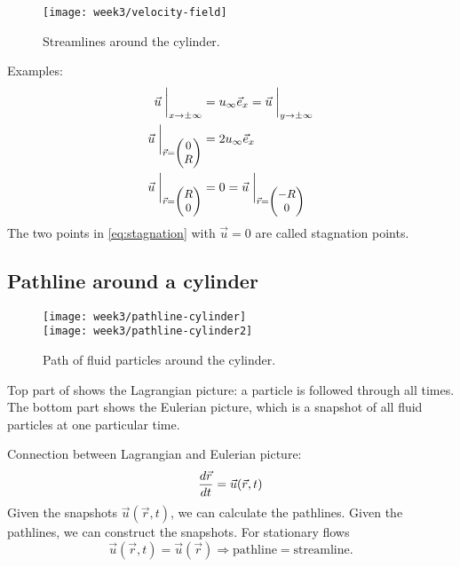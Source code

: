 \begin{figure}[!h]
    \centering
    \texttt{[image: week3/velocity-field]}
    \caption{Streamlines around the cylinder.}
    \label{fig:velocity-field2}
\end{figure}

Examples:
\begin{align}
\vec{u}\biggm\vert_{x\rightarrow\pm\infty} &= u_\infty\vec{e}_x = \vec{u}\biggm\vert_{y\rightarrow\pm\infty}\\
\vec{u}\biggm\vert_{\small\vec{r}=\begin{pmatrix} 0 \\ R
\end{pmatrix}} &= 2u_\infty\vec{e}_x \\
\vec{u}\biggm\vert_{\small\vec{r}=\begin{pmatrix} R \\ 0
\end{pmatrix}} &= 0 = \vec{u}\biggm\vert_{\small\vec{r}=\begin{pmatrix} -R \\ 0
\end{pmatrix}}\label{eq:stagnation}
\end{align}
The two points in \eqref{eq:stagnation} with $\vec{u}=0$ are called stagnation points.

\subsection{Pathline around a cylinder}
\begin{figure}[!h]
    \centering
    \texttt{[image: week3/pathline-cylinder]}\\
    \texttt{[image: week3/pathline-cylinder2]}
    \caption{Path of fluid particles around the cylinder.}
    \label{fig:pathline-cylinder}
\end{figure}
Top part of  shows the Lagrangian picture: a particle is followed through all times. The bottom part shows the Eulerian picture, which is a snapshot of all fluid particles at one particular time.

Connection between Lagrangian and Eulerian picture:
\begin{equation}
\frac{d \vec{r}}{d t} = \vec{u}(\vec{r},t)
\end{equation}
Given the snapshots $\vec{u}(\vec{r},t)$, we can calculate the pathlines. Given the pathlines, we can construct the snapshots. For stationary flows
\begin{equation}
\vec{u}(\vec{r},t)=\vec{u}(\vec{r}) \Rightarrow \mathrm{pathline} = \mathrm{streamline}.
\end{equation}

